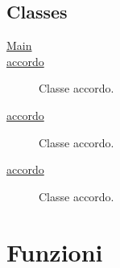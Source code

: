\hypertarget{classes}{%
\subsection{Classes}\label{classes}}

\begin{description}
\item[{ \protect\hyperlink{Main}{Main} }]
\item[{ \protect\hyperlink{accordo}{accordo} }]
Classe accordo.
\item[{ \protect\hyperlink{accordo}{accordo} }]
Classe accordo.
\item[{ \protect\hyperlink{accordo}{accordo} }]
Classe accordo.
\end{description}

\hypertarget{functions}{%
\section{Funzioni}\label{functions}}

